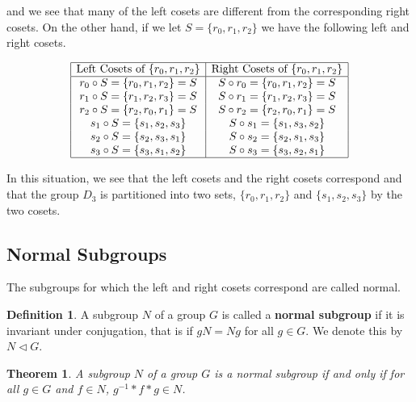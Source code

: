 \documentclass[
]{book}
\newtheorem{theorem}{Theorem}[chapter]
\theoremstyle{definition}
\newtheorem{definition}{Definition}[chapter]
\theoremstyle{definition}
\theoremstyle{definition}
\theoremstyle{definition}
\theoremstyle{remark}
\begin{document}
and we see that many of the left cosets are different from the corresponding right cosets. On the other hand, if we let \(S=\{r_0, r_1, r_2\}\) we have the following left and right cosets.

\[\begin{array}{|c|c|}
    \hline
    \mbox{Left Cosets of } \{r_0, r_1, r_2\} & \mbox{Right Cosets of } \{r_0, r_1, r_2\}\\ \hline
    r_0 \circ S = \{r_0, r_1, r_2\} = S & S \circ r_0 = \{r_0, r_1, r_2\} = S \\
     r_1 \circ S = \{r_1, r_2, r_3 \} = S & S \circ r_1 = \{r_1, r_2, r_3\} =S \\
     r_2 \circ S = \{r_2, r_0, r_1 \}=S & S \circ r_2 = \{r_2, r_0, r_1 \}=S \\
     s_1 \circ S = \{s_1, s_2, s_3\} & S \circ s_1 = \{s_1, s_3, s_2\} \\
     s_2 \circ S = \{s_2, s_3, s_1 \} & S \circ s_2 = \{s_2, s_1, s_3\}  \\
     s_3 \circ S = \{s_3, s_1, s_2 \} & S \circ s_3 = \{s_3, s_2, s_1 \}  \\ \hline
\end{array}\]

In this situation, we see that the left cosets and the right cosets correspond and that the group \(D_3\) is partitioned into two sets, \(\{r_0, r_1, r_2\}\) and \(\{s_1, s_2, s_3\}\) by the two cosets.

\hypertarget{normal-subgroups}{%
\subsection{Normal Subgroups}\label{normal-subgroups}}

The subgroups for which the left and right cosets correspond are called normal.

\begin{definition}
A subgroup \(N\) of a group \(G\) is called a \textbf{normal subgroup} if it is invariant under conjugation, that is if \(gN = Ng\) for all \(g\in G\). We denote this by \(N \vartriangleleft G\).
\end{definition}

\begin{theorem}
A subgroup \(N\) of a group \(G\) is a normal subgroup if and only if for all \(g\in G\) and \(f\in N\), \(g^{-1}*f*g \in N\).
\end{theorem}
\end{document}
